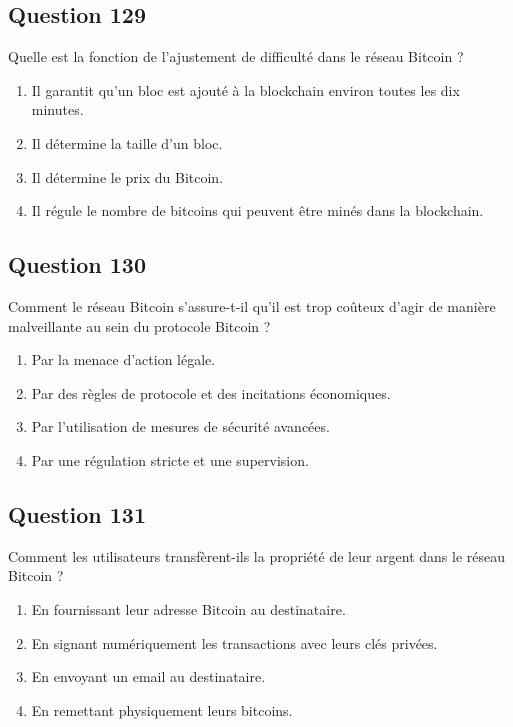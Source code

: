 \documentclass[12pt,a4paper]{article}
\begin{document}
\bigskip


\subsection*{Question 129}
Quelle est la fonction de l'ajustement de difficulté dans le réseau Bitcoin ?

\begin{enumerate}[label=\Alph*., leftmargin=*]
\item Il garantit qu'un bloc est ajouté à la blockchain environ toutes les dix minutes.
\item Il détermine la taille d'un bloc.
\item Il détermine le prix du Bitcoin.
\item Il régule le nombre de bitcoins qui peuvent être minés dans la blockchain.
\end{enumerate}

\bigskip


\subsection*{Question 130}
Comment le réseau Bitcoin s'assure-t-il qu'il est trop coûteux d'agir de manière malveillante au sein du protocole Bitcoin ?

\begin{enumerate}[label=\Alph*., leftmargin=*]
\item Par la menace d'action légale.
\item Par des règles de protocole et des incitations économiques.
\item Par l'utilisation de mesures de sécurité avancées.
\item Par une régulation stricte et une supervision.
\end{enumerate}

\bigskip


\subsection*{Question 131}
Comment les utilisateurs transfèrent-ils la propriété de leur argent dans le réseau Bitcoin ?

\begin{enumerate}[label=\Alph*., leftmargin=*]
\item En fournissant leur adresse Bitcoin au destinataire.
\item En signant numériquement les transactions avec leurs clés privées.
\item En envoyant un email au destinataire.
\item En remettant physiquement leurs bitcoins.
\end{enumerate}
\end{document}
